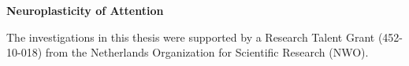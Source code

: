 
\thispagestyle{empty}
{\pagestyle{empty} 


\clearpage %
\null
\newpage

\vspace*{2cm}
\begin{center}
\Huge\textbf{Neuroplasticity of Attention} %
\end{center}

\clearpage
\vspace*{0.66\textheight}
\noindent The investigations in this thesis were supported by 
a Research Talent Grant (452-10-018)  %
from 
the Netherlands Organization for Scientific Research (NWO). %

}
